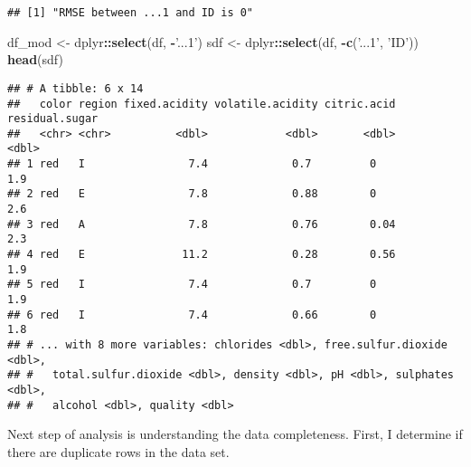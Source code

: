 \documentclass[
]{article}
\newenvironment{Shaded}{\begin{snugshade}}{\end{snugshade}}
\newcommand{\KeywordTok}[1]{\textcolor[rgb]{0.13,0.29,0.53}{\textbf{#1}}}
\newcommand{\NormalTok}[1]{#1}
\newcommand{\OperatorTok}[1]{\textcolor[rgb]{0.81,0.36,0.00}{\textbf{#1}}}
\newcommand{\StringTok}[1]{\textcolor[rgb]{0.31,0.60,0.02}{#1}}
\begin{document}
\begin{verbatim}
## [1] "RMSE between ...1 and ID is 0"
\end{verbatim}

\begin{Shaded}
\begin{Highlighting}[]
\NormalTok{df_mod <-}\StringTok{ }\NormalTok{dplyr}\OperatorTok{::}\KeywordTok{select}\NormalTok{(df, }\OperatorTok{-}\StringTok{'...1'}\NormalTok{)}
\NormalTok{sdf <-}\StringTok{ }\NormalTok{dplyr}\OperatorTok{::}\KeywordTok{select}\NormalTok{(df, }\OperatorTok{-}\KeywordTok{c}\NormalTok{(}\StringTok{'...1'}\NormalTok{, }\StringTok{'ID'}\NormalTok{))}
\KeywordTok{head}\NormalTok{(sdf)}
\end{Highlighting}
\end{Shaded}

\begin{verbatim}
## # A tibble: 6 x 14
##   color region fixed.acidity volatile.acidity citric.acid residual.sugar
##   <chr> <chr>          <dbl>            <dbl>       <dbl>          <dbl>
## 1 red   I                7.4             0.7         0               1.9
## 2 red   E                7.8             0.88        0               2.6
## 3 red   A                7.8             0.76        0.04            2.3
## 4 red   E               11.2             0.28        0.56            1.9
## 5 red   I                7.4             0.7         0               1.9
## 6 red   I                7.4             0.66        0               1.8
## # ... with 8 more variables: chlorides <dbl>, free.sulfur.dioxide <dbl>,
## #   total.sulfur.dioxide <dbl>, density <dbl>, pH <dbl>, sulphates <dbl>,
## #   alcohol <dbl>, quality <dbl>
\end{verbatim}

Next step of analysis is understanding the data completeness. First, I
determine if there are duplicate rows in the data set.

\begin{Shaded}
\end{Shaded}
\end{document}
